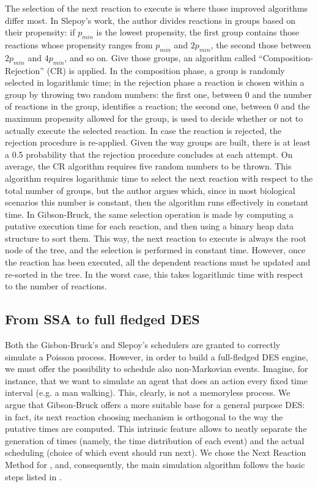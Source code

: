 \documentclass[12pt,a4paper,twoside,openright]{book}
\begin{document}
The selection of the next reaction to execute is where those improved algorithms differ most.
%
In Slepoy's work, the author divides reactions in groups based on their propensity: if $p_{min}$ is the lowest propensity, the first group contains those reactions whose propensity ranges from $p_{min}$ and $2 p_{min}$, the second those between $2 p_{min}$ and $4 p_{min}$, and so on.
%
Give those groups, an algorithm called ``Composition-Rejection'' (CR) is applied.
%
In the composition phase, a group is randomly selected in logarithmic time; in the rejection phase a reaction is chosen within a group by throwing two random numbers: the first one, between $0$ and the number of reactions in the group, identifies a reaction; the second one, between $0$ and the maximum propensity allowed for the group, is used to decide whether or not to actually execute the selected reaction.
%
In case the reaction is rejected, the rejection procedure is re-applied.
%
Given the way groups are built, there is at least a 0.5 probability that the rejection procedure concludes at each attempt.
%
On average, the CR algorithm requires five random numbers to be thrown.
%
This algorithm requires logarithmic time to select the next reaction with respect to the total number of groups, but the author argues which, since in most biological scenarios this number is constant, then the algorithm runs effectively in constant time.
%
In Gibson-Bruck, the same selection operation is made by computing a putative execution time for each reaction, and then using a binary heap data structure to sort them.
%
This way, the next reaction to execute is always the root node of the tree, and the selection is performed in constant time.
%
However, once the reaction has been executed, all the dependent reactions must be updated and re-sorted in the tree. In the worst case, this takes logarithmic time with respect to the number of reactions.

\subsection{From SSA to full fledged DES}

Both the Gisbon-Bruck's and Slepoy's schedulers are granted to correctly simulate a Poisson process.
%
However, in order to build a full-fledged DES engine, we must offer the possibility to schedule also non-Markovian events.
%
Imagine, for instance, that we want to simulate an agent that does an action every fixed time interval (e.g. a man walking).
%
This, clearly, is not a memoryless process.
%
We argue that Gibson-Bruck offers a more suitable base for a general purpose DES: in fact, its next reaction choosing mechanism is orthogonal to the way the putative times are computed.
%
This intrinsic feature allows to neatly separate the generation of times (namely, the time distribution of each event) and the actual scheduling (choice of which event should run next).
%
We chose the Next Reaction Method for \alchemist{}, and, consequently, the main simulation algorithm follows the basic steps listed in .
\end{document}
